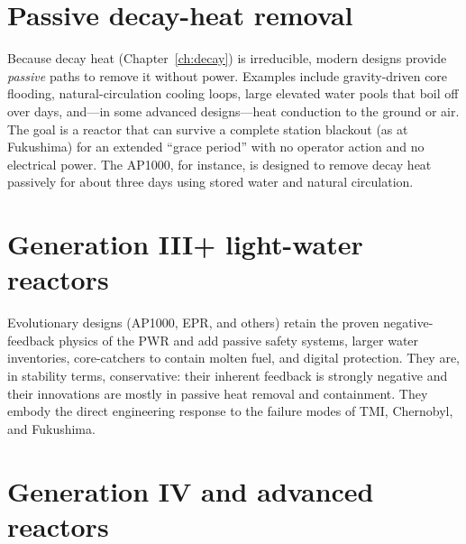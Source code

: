 \section{Passive decay-heat removal}

Because decay heat (Chapter~\ref{ch:decay}) is irreducible, modern designs provide
\emph{passive} paths to remove it without power. Examples include gravity-driven
core flooding, natural-circulation cooling loops, large elevated water pools that
boil off over days, and---in some advanced designs---heat conduction to the ground
or air. The goal is a reactor that can survive a complete station blackout (as at
Fukushima) for an extended ``grace period'' with no operator action and no
electrical power. The AP1000, for instance, is designed to remove decay heat
passively for about three days using stored water and natural circulation.

\section{Generation III+ light-water reactors}

Evolutionary designs (AP1000, EPR, and others) retain the proven negative-feedback
physics of the PWR and add passive safety systems, larger water inventories,
core-catchers to contain molten fuel, and digital protection. They are, in
stability terms, conservative: their inherent feedback is strongly negative and
their innovations are mostly in passive heat removal and containment. They embody
the direct engineering response to the failure modes of TMI, Chernobyl, and
Fukushima.

\section{Generation IV and advanced reactors}

